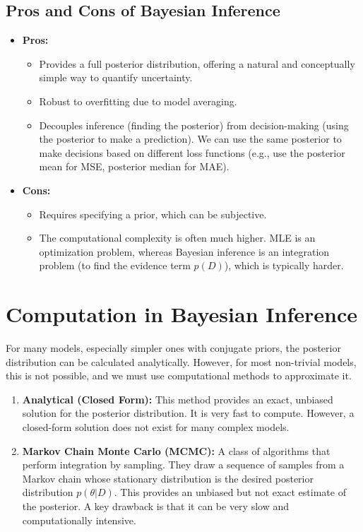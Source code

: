 \documentclass{article}
\begin{document}
\begin{multicols}{2}
	\subsection{Pros and Cons of Bayesian Inference}
	\begin{itemize}
		\item \textbf{Pros:}
		      \begin{itemize}
			      \item Provides a full posterior distribution, offering a natural and conceptually simple way to quantify uncertainty.
			      \item Robust to overfitting due to model averaging.
			      \item Decouples inference (finding the posterior) from decision-making (using the posterior to make a prediction). We can use the same posterior to make decisions based on different loss functions (e.g., use the posterior mean for MSE, posterior median for MAE).
		      \end{itemize}
		\item \textbf{Cons:}
		      \begin{itemize}
			      \item Requires specifying a prior, which can be subjective.
			      \item The computational complexity is often much higher. MLE is an optimization problem, whereas Bayesian inference is an integration problem (to find the evidence term $p(D)$), which is typically harder.
		      \end{itemize}
	\end{itemize}

	\section{Computation in Bayesian Inference}
	For many models, especially simpler ones with conjugate priors, the posterior distribution can be calculated analytically. However, for most non-trivial models, this is not possible, and we must use computational methods to approximate it.

	\begin{enumerate}
		\item \textbf{Analytical (Closed Form):} This method provides an exact, unbiased solution for the posterior distribution. It is very fast to compute. However, a closed-form solution does not exist for many complex models.

		\item \textbf{Markov Chain Monte Carlo (MCMC):} A class of algorithms that perform integration by sampling. They draw a sequence of samples from a Markov chain whose stationary distribution is the desired posterior distribution $p(\theta|D)$. This provides an unbiased but not exact estimate of the posterior. A key drawback is that it can be very slow and computationally intensive.


\end{enumerate}
\end{multicols}
\end{document}
